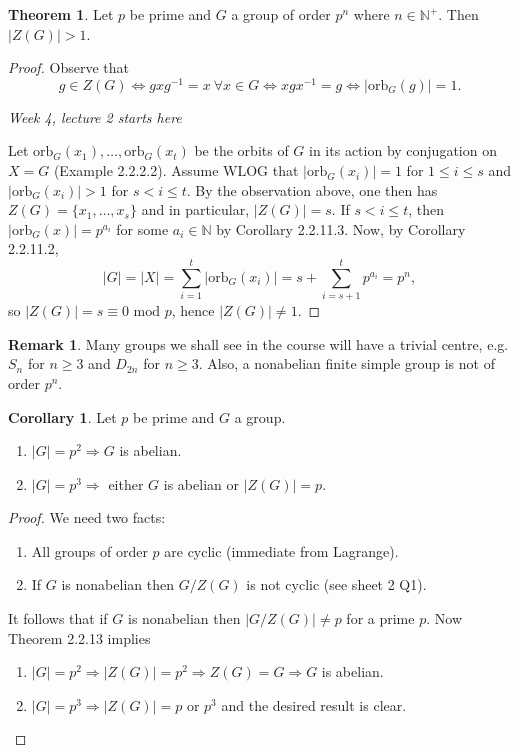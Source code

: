 \documentclass[a4paper]{article}
\newcommand{\orb}{\text{orb}}
\newcommand{\Mod}{\text{ mod }}
\theoremstyle{definition}
\newtheorem{thm}[defn]{Theorem}
\newtheorem{coro}[defn]{Corollary}
\newtheorem*{remark}{Remark}
\begin{document}
\begin{thm}
Let $p$ be prime and $G$ a group of order $p^n$ where $n\in\mathbb N^+$. Then $|Z(G)|>1$.
\end{thm}
\begin{proof}
Observe that
\[
g\in Z(G)\Leftrightarrow gxg^{-1}=x \ \forall x\in G \Leftrightarrow xgx^{-1}=g \Leftrightarrow |\orb_G(g)|=1.
\]

\begin{flushright}
\textit{Week 4, lecture 2 starts here}
\end{flushright}

Let $\orb_G(x_1),\ldots,\orb_G(x_t)$ be the orbits of $G$ in its action by conjugation on $X=G$ (Example 2.2.2.2). Assume WLOG that $|\orb_G(x_i)|=1$ for $1\leq i\leq s$ and $|\orb_G(x_i)|>1$ for $s<i\leq t$. By the observation above, one then has $Z(G)=\{x_1,\ldots,x_s\}$ and in particular, $|Z(G)|=s$. If $s<i\leq t$, then $|\orb_G(x)|=p^{a_i}$ for some $a_i\in \mathbb N$ by Corollary 2.2.11.3. Now, by Corollary 2.2.11.2,
\[
|G|=|X|=\sum_{i=1}^t \left|\orb_G(x_i)\right|=s+\sum_{i=s+1}^t p^{a_i}=p^n,
\]
so $|Z(G)|=s\equiv 0\Mod p$, hence $|Z(G)|\neq 1$.
\end{proof}

\begin{remark}
Many groups we shall see in the course will have a trivial centre, e.g. $S_n$ for $n\geq 3$ and $D_{2n}$ for $n\geq 3$. Also, a nonabelian finite simple group is not of order $p^n$.
\end{remark}

\begin{coro}
Let $p$ be prime and $G$ a group.
\begin{enumerate}
\item $|G|=p^2\Rightarrow G$ is abelian.
\item $|G|=p^3\Rightarrow$ either $G$ is abelian or $|Z(G)|=p$.
\end{enumerate}
\end{coro}
\begin{proof}
We need two facts:
\begin{enumerate}
\item All groups of order $p$ are cyclic (immediate from Lagrange).
\item If $G$ is nonabelian then $G/Z(G)$ is not cyclic (see sheet 2 Q1).
\end{enumerate}
It follows that if $G$ is nonabelian then $|G/Z(G)|\neq p$ for a prime $p$. Now Theorem 2.2.13 implies
\begin{enumerate}
\item $|G|=p^2\Rightarrow |Z(G)|=p^2\Rightarrow Z(G)=G \Rightarrow G$ is abelian.
\item $|G|=p^3\Rightarrow |Z(G)|=p$ or $p^3$ and the desired result is clear.
\end{enumerate}
\end{proof}
\end{document}
